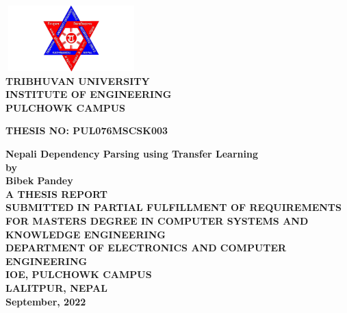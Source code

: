\begin{titlingpage} %
\begin{normalsize}
\begin{center}
\includegraphics[width=2in, height=1in]{logo}\\ %

\bfseries 
TRIBHUVAN UNIVERSITY\\
 INSTITUTE OF ENGINEERING\\

\textbf{PULCHOWK CAMPUS}\\
\end{center}
\vspace{1cm}
\bfseries THESIS NO: PUL076MSCSK003\\
\begin{center}
\textbf{Nepali Dependency Parsing using Transfer Learning} \\
\vspace{2cm}
\bfseries by\\
    \textbf{Bibek Pandey}\\
\vspace{2cm}
{\textbf{A THESIS REPORT\\SUBMITTED IN PARTIAL FULFILLMENT OF REQUIREMENTS FOR
    MASTERS DEGREE IN COMPUTER SYSTEMS AND KNOWLEDGE
    ENGINEERING}}\\
\vspace{2cm}
\bfseries {DEPARTMENT OF ELECTRONICS AND COMPUTER ENGINEERING}\\
IOE, PULCHOWK CAMPUS \\
LALITPUR, NEPAL\\
\vspace{1.5cm}
September, 2022
\end{center}
\end{normalsize}
\end{titlingpage}
\newpage
